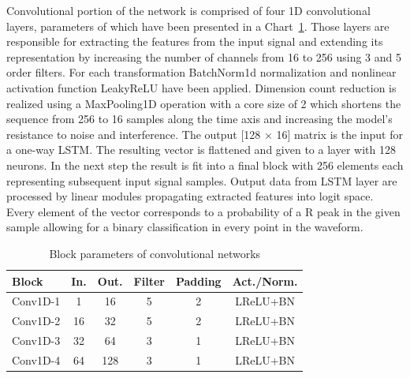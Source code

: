 \documentclass[journal]{IEEEtran}
\begin{document}
Convolutional portion of the network is comprised of four 1D convolutional layers, parameters of which have been presented in a Chart~\ref{tab:ecg_layers}. Those layers are responsible for extracting the features from the input signal and extending its representation by increasing the number of channels from 16 to 256 using 3 and 5 order filters. For each transformation BatchNorm1d normalization and nonlinear activation function LeakyReLU have been applied. Dimension count reduction is realized using a MaxPooling1D operation with a core size of 2 which shortens the sequence from 256 to 16 samples along the time axis and increasing the model's resistance to noise and interference. The output [128 × 16] matrix is the input for a one-way LSTM. The resulting vector is flattened and given to a layer with 128 neurons. In the next step the result is fit into a final block with 256 elements each representing subsequent input signal samples. Output data from LSTM layer are processed by linear modules propagating extracted features into logit space. Every element of the vector corresponds to a probability of a R peak in the given sample allowing for a binary classification in every point in the waveform.

\begin{table}[h!]
\centering
\caption{Block parameters of convolutional networks}
\label{tab:ecg_layers}
\begin{tabular}{|l|c|c|c|c|c|}
\hline
\textbf{Block} & \textbf{In.} & \textbf{Out.} & \textbf{Filter} & \textbf{Padding} & \textbf{Act./Norm.} \\
\hline
Conv1D-1 & 1   & 16  & 5 & 2 & LReLU+BN \\
Conv1D-2 & 16  & 32  & 5 & 2 & LReLU+BN \\
Conv1D-3 & 32  & 64  & 3 & 1 & LReLU+BN \\
Conv1D-4 & 64  & 128 & 3 & 1 & LReLU+BN \\
\hline
\end{tabular}
\end{table}
\end{document}
